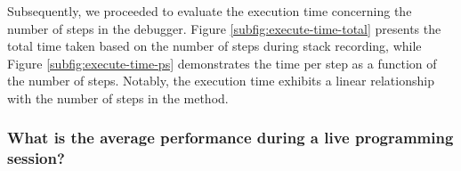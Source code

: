 \documentclass[english,submission]{programming}
\begin{document}
Subsequently, we proceeded to evaluate the execution time concerning the number of steps in the debugger. 
Figure \ref{subfig:execute-time-total} presents the total time taken based on the number of steps during stack recording, while Figure \ref{subfig:execute-time-ps} demonstrates the time per step as a function of the number of steps. 
Notably, the execution time exhibits a linear relationship with the number of steps in the method.

\subsubsection{What is the average performance during a live programming session?}

\end{document}
